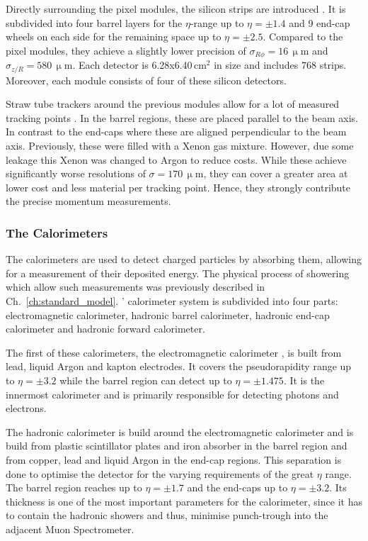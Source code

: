 \documentclass[bachelor,ngerman,english]{GAUBM}
\begin{document}
Directly surrounding the pixel modules, the silicon strips are introduced \cite{atlas:tech_design_report_01,atlas:strip_detector}. It is subdivided into four barrel layers for the $\eta$-range up to $\eta=\pm1.4$ and 9 end-cap wheels on each side for the remaining space up to $\eta=\pm2.5$. Compared to the pixel modules, they achieve a slightly lower precision of $\sigma_{R\phi}=16\,\upmu\text{m}$ and $\sigma_{z/R}=580\,\upmu\text{m}$. Each detector is 6.28x6.40\,cm$^2$ in size and includes 768 strips. Moreover, each module consists of four of these silicon detectors.

Straw tube trackers around the previous modules allow for a lot of measured tracking points \cite{atlas:tech_design_report_01,atlas:transition_detector}. In the barrel regions, these are placed parallel to the beam axis. In contrast to the end-caps where these are aligned perpendicular to the beam axis. Previously, these were filled with a Xenon gas mixture. However, due some leakage this Xenon was changed to Argon to reduce costs. While these achieve significantly worse resolutions of $\sigma=170\,\upmu\text{m}$, they can cover a greater area at lower cost and less material per tracking point. Hence, they strongly contribute the precise momentum measurements.

\subsubsection*{The Calorimeters}
The calorimeters \cite{atlas:tech_design_report_01,atlas:calorimeter} are used to detect charged particles by absorbing them, allowing for a measurement of their deposited energy. The physical process of showering which allow such measurements was previously described in Ch.~\ref{ch:standard_model}. \atlas' calorimeter system is subdivided into four parts: electromagnetic calorimeter, hadronic barrel calorimeter, hadronic end-cap calorimeter and hadronic forward calorimeter.

The first of these calorimeters, the electromagnetic calorimeter \cite{atlas:tech_design_report_01}, is built from lead, liquid Argon and kapton electrodes. It covers the pseudorapidity range up to $\eta=\pm3.2$ while the barrel region can detect up to $\eta=\pm1.475$. It is the innermost calorimeter and is primarily responsible for detecting photons and electrons. 

The hadronic calorimeter \cite{atlas:tech_design_report_01} is build around the electromagnetic calorimeter and is build from plastic scintillator plates and iron absorber in the barrel region and from copper, lead and liquid Argon in the end-cap regions. This separation is done to optimise the detector for the varying requirements of the great $\eta$ range. The barrel region reaches up to $\eta=\pm1.7$ and the end-caps up to $\eta=\pm3.2$. Its thickness is one of the most important parameters for the calorimeter, since it has to contain the hadronic showers and thus, minimise punch-trough into the adjacent Muon Spectrometer.
\end{document}

